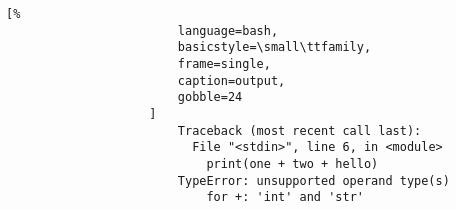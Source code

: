 \documentclass[crop=false,class=book]{standalone}
\begin{document}
                \begin{minipage}[t]{.48\textwidth}
                    \centering
                    \begin{lstlisting}[%
                        language=bash,
                        basicstyle=\small\ttfamily,
                        frame=single,
                        caption=output,
                        gobble=24
                    ]
                        Traceback (most recent call last):
                          File "<stdin>", line 6, in <module>
                            print(one + two + hello)
                        TypeError: unsupported operand type(s)
                            for +: 'int' and 'str'
                    \end{lstlisting}
                \end{minipage}
                \newpage
\end{document}
